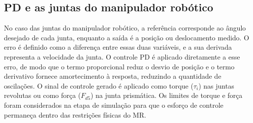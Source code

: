\subsection{PD e as juntas do manipulador robótico}
No caso das juntas do manipulador robótico, a referência corresponde ao ângulo desejado de cada junta, enquanto a saída é a posição ou deslocamento medido.
O erro é definido como a diferença entre essas duas variáveis, e a sua derivada representa a velocidade da junta.
O controle PD é aplicado diretamente a esse erro, de modo que o termo proporcional reduz o desvio de posição e o termo derivativo fornece amortecimento à resposta, reduzindo a quantidade de oscilações.
O sinal de controle gerado é aplicado como torque ($\tau_i$) nas juntas revolutas ou como força ($F_{d5}$) na junta prismática.
Os limites de torque e força foram considerados na etapa de simulação para que o esforço de controle permaneça dentro das restrições físicas do MR.